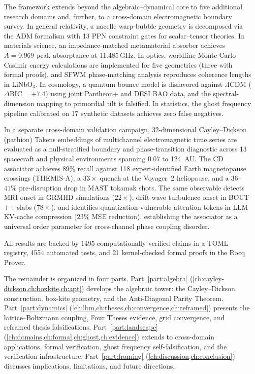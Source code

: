 \documentclass[12pt,openany]{report}
\theoremstyle{definition}
\theoremstyle{plain}
\theoremstyle{remark}
\newcommand{\claimcount}{1495}
\newcommand{\testcount}{4554}
\newcommand{\kernelchecked}{21}
\begin{document}
The framework extends beyond the algebraic--dynamical core to five
additional research domains and, further, to a cross-domain
electromagnetic boundary survey.  In general relativity, a nacelle
warp-bubble geometry is decomposed via the ADM formalism with
13 PPN constraint gates for scalar--tensor theories.  In materials
science, an impedance-matched metamaterial absorber achieves
$A = 0.969$ peak absorptance at 11.485\,GHz.  In optics, worldline
Monte Carlo Casimir energy calculations are implemented for five
geometries (three with formal proofs), and SFWM phase-matching
analysis reproduces coherence lengths in LiNbO$_3$.  In cosmology,
a quantum bounce model is disfavored against $\Lambda$CDM
($\Delta\mathrm{BIC} = +7.4$) using joint Pantheon+ and DESI BAO
data, and the spectral-dimension mapping to primordial tilt is
falsified.  In statistics, the ghost frequency pipeline calibrated
on 17 synthetic datasets achieves zero false negatives.

In a separate cross-domain validation campaign, 32-dimensional
Cayley--Dickson (pathion) Takens embeddings of multichannel
electromagnetic time series are evaluated as a null-stratified
boundary and phase-transition diagnostic across 13 spacecraft and
physical environments spanning 0.07 to 124~AU.  The CD associator
achieves $89\%$ recall against 118 expert-identified Earth
magnetopause crossings (THEMIS-A), a $33\times$ quench at the
Voyager~2 heliopause, and a $36$--$41\%$ pre-disruption drop in
MAST tokamak shots.  The same observable detects MRI onset in
GRMHD simulations ($22\times$), drift-wave turbulence onset in
BOUT$+$$+$ slabs ($78\times$), and identifies quantization-vulnerable
attention tokens in LLM KV-cache compression ($23\%$ MSE reduction),
establishing the associator as a universal order parameter for
cross-channel phase coupling disorder.

All results are backed by \claimcount{} computationally verified claims
in a TOML registry, \testcount{} automated tests, and
\kernelchecked{} kernel-checked formal proofs in the Rocq Prover.

The remainder is organized in four parts.
Part~\ref{part:algebra} (\cref{ch:cayley-dickson,ch:boxkite,ch:apt})
develops the algebraic tower: the Cayley--Dickson construction,
box-kite geometry, and the Anti-Diagonal Parity Theorem.
Part~\ref{part:dynamics}
(\cref{ch:lbm,ch:theses,ch:convergence,ch:reframed}) presents the
lattice--Boltzmann coupling, Four Theses evidence, grid convergence,
and reframed thesis falsifications.
Part~\ref{part:landscape}
(\cref{ch:domains,ch:formal,ch:ghost,ch:evidence}) extends to
cross-domain applications, formal verification, ghost frequency
self-falsification, and the verification infrastructure.
Part~\ref{part:framing} (\cref{ch:discussion,ch:conclusion}) discusses
implications, limitations, and future directions.
\end{document}

